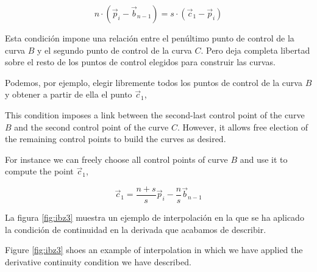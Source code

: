 \begin{equation*}
n\cdot\left(\vec{p}_i-\vec{b}_{n-1}\right) = s\cdot\left(\vec{c}_1-\vec{p}_i\right)
\end{equation*}
\begin{paracol}{2} 
Esta condición impone una relación entre el penúltimo punto de control de la curva $B$ y el segundo punto de control de la curva $C$. Pero deja completa libertad sobre el resto de los puntos de control elegidos para construir las curvas.

Podemos, por ejemplo, elegir libremente todos los puntos de control de la curva $B$ y obtener a partir de ella el punto $\vec{c}_1$,

\switchcolumn
This condition imposes a link between the second-last control point of the curve $B$ and the second control point of the curve $C$. However, it allows free election of the remaining control points to build the curves as desired.

For instance we can freely choose all control points of curve $B$ and use it to compute the point $\vec{c}_1$,
\end{paracol}
\begin{equation*}
\vec{c}_1 = \frac{n+s}{s}\vec{p}_i - \frac{n}{s}\vec{b}_{n-1}
\end{equation*}
\begin{paracol}{2}
	La figura \ref{fig:ibz3} muestra un ejemplo de interpolación en la que se ha aplicado la condición de continuidad en la derivada que acabamos de describir.
	
	\switchcolumn
	Figure \ref{fig:ibz3} shoes an example of interpolation in which we have applied the derivative continuity condition we have described. 
\end{paracol}

